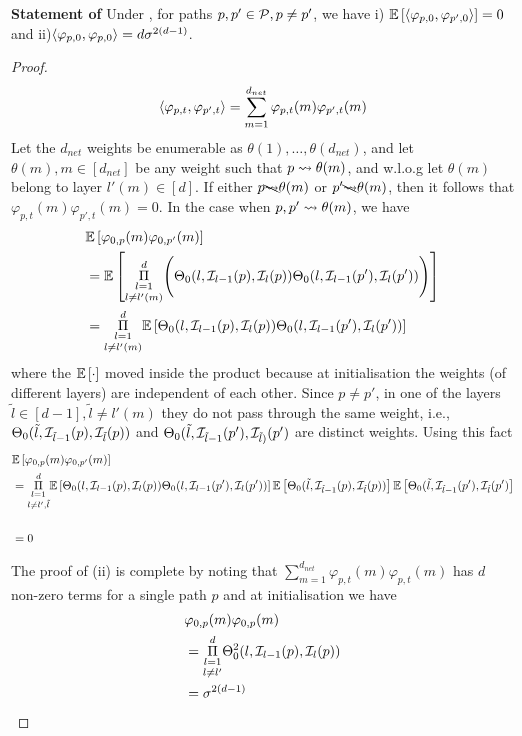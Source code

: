 \textbf{Statement of }
Under , for paths $p,p'\in \P, p\neq p'$, we have  i) $\E{\ip{\varphi_{p,0}, \varphi_{p',0}}}= 0$ and ii)${\ip{\varphi_{p,0}, \varphi_{p,0}}}= d\sigma^{2(d-1)}$.
\begin{proof}
\begin{align*}
\ip{\varphi_{p,t}, \varphi_{p',t}}= \sum_{m=1}^{d_{net}} \varphi_{p,t}(m)\varphi_{p',t}(m)
\end{align*}
Let the $d_{net}$ weights be enumerable as $\theta(1),\ldots,\theta(d_{net})$, and let $\theta(m),m\in[d_{net}]$ be any weight such that $p\rsa \theta(m)$, and w.l.o.g let $\theta(m)$ belong to layer $l'(m)\in[d]$. 
If either $p\bcancel{\rsa}\theta(m)$ or $p'\bcancel{\rsa}\theta(m)$, then it follows that $\varphi_{p,t}(m)\varphi_{p',t}(m)=0$. In the case when $p,p'\rsa\theta(m)$, we have
\begin{align*}
&\E{\varphi_{0,p}(m)\varphi_{0,p'}(m)}\\
&=\E{\underset{l\neq l'(m)}{\underset{l=1}{\overset{d}{\Pi}}} \Bigg(\Tb_0(l,\I_{l-1}(p),\I_l(p))\Tb_0(l,\I_{l-1}(p'),\I_l(p')) \Bigg)}\\
&=\underset{l\neq l'(m)}{\underset{l=1}{\overset{d}{\Pi}}}\E{\Tb_0(l,\I_{l-1}(p),\I_l(p))\Tb_0(l,\I_{l-1}(p'),\I_l(p'))}
\end{align*}
where the $\E{\cdot}$ moved inside the product because at initialisation the weights (of different layers) are independent of each other.
Since $p\neq p'$, in one of the layers $\tilde{l}\in[d-1],\tilde{l}\neq l'(m)$ they do not pass through the same weight, i.e., $\Tb_0(\tilde{l},\I_{\tilde{l}-1}(p),\I_{\tilde{l}}(p))$ and $\Tb_0(\tilde{l},\I_{\tilde{l}-1}(p'),\I_{\tilde{l})}(p')$ are distinct weights. Using this fact
\begin{align*}
&\E{\varphi_{0,p}(m)\varphi_{0,p'}(m)}\\
&=\underset{l\neq l',\tilde{l}}{\underset{l=1}{\overset{d}{\Pi}}}\E{\Tb_0(l,\I_{l-1}(p),\I_l(p))\Tb_0(l,\I_{l-1}(p'),\I_l(p'))}\E{\Tb_0(\tilde{l},\I_{\tilde{l}-1}(p),\I_{\tilde{l}}(p))}\E{\Tb_0(\tilde{l},\I_{\tilde{l}-1}(p'),\I_{\tilde{l}}(p')}\\\\
&=0
\end{align*}

The proof of (ii) is complete by noting that $\sum_{m=1}^{d_{net}} \varphi_{p,t}(m)\varphi_{p,t}(m)$ has $d$ non-zero terms for a single path $p$ and at initialisation we have 
\begin{align*}
&{\varphi_{0,p}(m)\varphi_{0,p}(m)}\\
&={\underset{l\neq l'}{\underset{l=1}{\overset{d}{\Pi}}} \Tb^2_0(l,\I_{l-1}(p),\I_l(p))}\\
&=\sigma^{2(d-1)}
\end{align*}
\end{proof}


